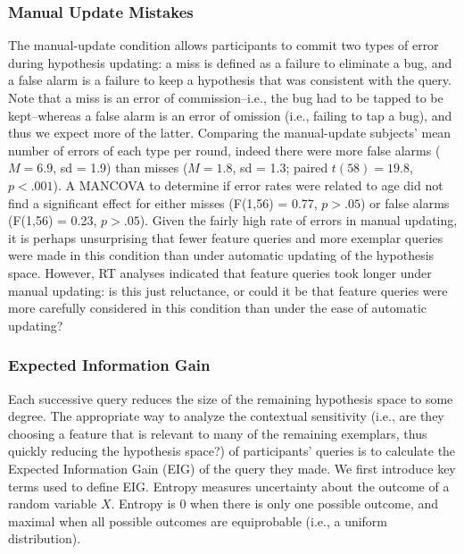 \documentclass[10pt,letterpaper]{article}
\begin{document}
\subsubsection{Manual Update Mistakes}

The manual-update condition allows participants to commit two types of error during 
hypothesis updating: a miss is defined as a failure to eliminate a bug, and a false 
alarm is a failure to keep a hypothesis that was consistent with the query. Note that 
a miss is an error of commission--i.e., the bug had to be tapped to be kept--whereas 
a false alarm is an error of omission (i.e., failing to tap a bug), and thus we expect 
more of the latter. Comparing the manual-update subjects' mean number of errors of 
each type per round, indeed there were more false alarms ($M=6.9$, sd = 1.9) than 
misses ($M=1.8$, sd = 1.3; paired $t(58) = 19.8$, $p<.001$). A MANCOVA to 
determine if error rates were related to age did not find a significant effect for either 
misses (F(1,56) = 0.77, $p>.05$) or false alarms (F(1,56) = 0.23, $p>.05$). Given 
the fairly high rate of errors in manual updating, it is perhaps unsurprising that fewer 
feature queries and more exemplar queries were made in this condition than under 
automatic updating of the hypothesis space. However, RT analyses indicated that 
feature queries took longer under manual updating: is this just reluctance, or could it 
be that feature queries were more carefully considered in this condition than under 
the ease of automatic updating? 

\subsubsection{Expected Information Gain}

Each successive query reduces the size of the remaining hypothesis space to some 
degree. The appropriate way to analyze the contextual sensitivity (i.e., are they 
choosing a feature that is relevant to many of the remaining exemplars, thus quickly 
reducing the hypothesis space?) of participants' queries is to calculate the Expected 
Information Gain (EIG) of the query they made. We first introduce key terms used to 
define EIG. Entropy measures uncertainty about the outcome of a random variable 
$X$. Entropy is 0 when there is only one possible outcome, and maximal when all 
possible outcomes are equiprobable (i.e., a uniform distribution).
\end{document}
